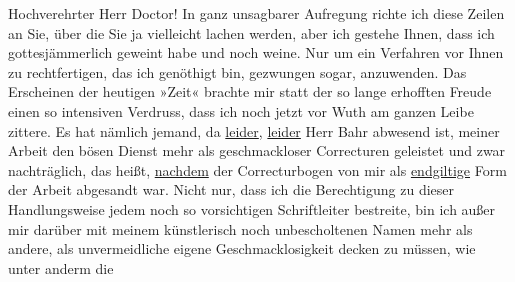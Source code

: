 \pstart\center{}Hochverehrter Herr Doctor!\pend\vspace{0.5em}
\pstart
           In ganz unsagbarer Aufregung richte ich diese Zeilen an Sie, über die Sie ja
               vielleicht lachen werden, aber ich gestehe Ihnen, dass ich gottesjämmerlich geweint
               habe und noch weine. Nur um ein Verfahren vor Ihnen zu rechtfertigen, das ich
               genöthigt bin, gezwungen sogar, anzuwenden. Das {\pb}Erscheinen der heutigen »Zeit« brachte mir
               statt der so lange erhofften Freude einen so intensiven Verdruss, dass ich noch jetzt
               vor Wuth am ganzen Leibe zittere. Es hat nämlich jemand, da \uline{leider}, \uline{leider} Herr Bahr abwesend ist, meiner Arbeit den bösen Dienst mehr als geschmackloser Correcturen
               geleistet und zwar nachträglich, das heißt, \uline{nachdem}
               der Correcturbogen von mir als \uline{endgiltige} Form der
                  Arbeit abgesandt war. Nicht
               nur, dass ich die Berech{\pb}tigung zu dieser
               Handlungsweise jedem noch so vorsichtigen Schriftleiter bestreite, bin ich außer mir
               darüber mit meinem künstlerisch noch unbescholtenen Namen mehr als andere, als
               unvermeidliche eigene Geschmacklosigkeit decken zu müssen, wie unter anderm die

